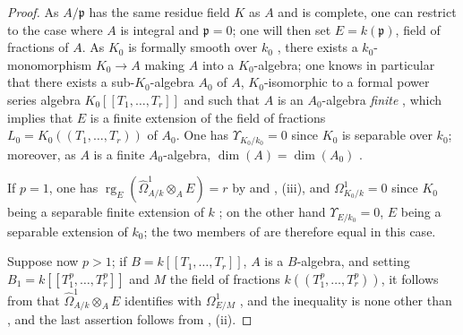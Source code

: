 \begin{proof}
As $A/\mathfrak{p}$ has the same residue field $K$ as $A$ and is complete, one can restrict to the case where $A$ is integral and $\mathfrak{p}=0$; one will then set $E=k(\mathfrak{p})$, field of fractions of $A$.
As $K_0$ is formally smooth over $k_0$ , there exists a $k_0$-monomorphism $K_0\to A$ making $A$ into a $K_0$-algebra; one knows in particular that there exists a sub-$K_0$-algebra $A_0$ of $A$, $K_0$-isomorphic to a formal power series algebra $K_0[[T_1,\ldots,T_r]]$ and such that $A$ is an $A_0$-algebra \emph{finite} , which implies that $E$ is a finite extension of the field of fractions $L_0=K_0((T_1,\ldots,T_r))$ of $A_0$.
One has $\Upsilon_{K_0/k_0}=0$ since $K_0$ is separable over $k_0$; moreover, as $A$ is a finite $A_0$-algebra, $\dim(A)=\dim(A_0)$ .

If $p=1$, one has $\operatorname{rg}_E(\widehat{\Omega}^1_{A/k}\otimes_A E)=r$ by  and , (iii), and $\Omega^1_{K_0/k}=0$ since $K_0$ being a separable finite extension of $k$ ; on the other hand $\Upsilon_{E/k_0}=0$, $E$ being a separable extension of $k_0$; the two members of  are therefore equal in this case.

Suppose now $p>1$; if $B=k[[T_1,\ldots,T_r]]$, $A$ is a $B$-algebra, and setting $B_1=k[[T_1^p,\ldots,T_r^p]]$ and $M$ the field of fractions $k((T_1^p,\ldots,T_r^p))$, it follows from  that $\widehat{\Omega}^1_{A/k}\otimes_A E$ identifies with $\Omega^1_{E/M}$ , and the inequality  is none other than , and the last assertion follows from , (ii).
\end{proof}
